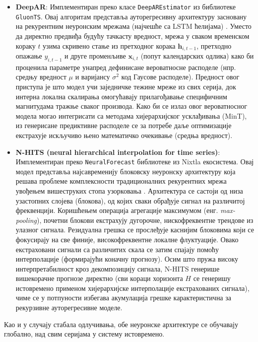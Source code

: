 \documentclass[12pt,oneside]{memoir}
\begin{document}
\begin{itemize}
	\item \textbf{DeepAR}: Имплементиран преко класе \texttt{DeepAREstimator} из библиотеке \texttt{GluonTS}. Овај алгоритам представља ауторегресивну архитектуру засновану на рекурентним неуронским мрежама (најчешће са LSTM ћелијама)  \cite{salinas2020deepar}. Уместо да директно предвиђа будућу тачкасту вредност, мрежа у сваком временском кораку $t$ узима скривено стање из претходног корака $\mathbf{h}_{i,t-1}$, претходно опажање $y_{i,t-1}$ и друге променљиве $\mathbf{x}_{i,t}$ (попут календарских одлика) како би проценила параметре унапред дефинисане вероватносне расподеле (нпр. средњу вредност $\mu$ и варијансу $\sigma^2$ код Гаусове расподеле). Предност овог приступа је што модел учи заједничке тежине мреже из свих серија, док интерна локална скалирања омогућавају прилагођавање специфичним магнитудама тражње сваког производа. Како би се излаз овог вероватносног модела могао интегрисати са методама  хијерархијског усклађивања (MinT), из генерисане предиктивне расподеле се за потребе даље оптимизације екстрахује искључиво њено математичко очекивање (средња вредност).
    
	\item \textbf{N-HITS (neural hierarchical interpolation for time series)}: Имплементиран преко \texttt{NeuralForecast} библиотеке из Nixtla екосистема. Овај модел представља најсавременију блоковску неуронску архитектуру која решава проблеме комплексности традиционалних рекурентних мрежа увођењем вишеструких стопа узорковања \cite{challu2023nhits}. Архитектура се састоји од низа узастопних слојева (блокова), од којих сваки обрађује сигнал на различитој фреквенцији. Коришћењем операција агрегације максимумом (енг. \textit{max-pooling}), почетни блокови екстрахују дугорочне, нискофреквентне трендове из улазног сигнала. Резидуална грешка се прослеђује каснијим блоковима који се фокусирају на све финије, високофреквентне локалне флуктуације. Овако екстраховани сигнали са различитих скала се затим спајају помоћу интерполације (формирајући коначну прогнозу). Осим што пружа високу интерпретабилност кроз декомпозицију сигнала, N-HITS генерише вишекорачне прогнозе директно (сви кораци хоризонта $H$ се генеришу истовремено применом хијерархијске интерполације екстрахованих сигнала), чиме се у потпуности избегава акумулација грешке карактеристична за рекурзивне ауторегресивне моделе.
\end{itemize}

Као и у случају стабала одлучивања, обе неуронске архитектуре се обучавају глобално, над свим серијама у систему истовремено.
\end{document}

